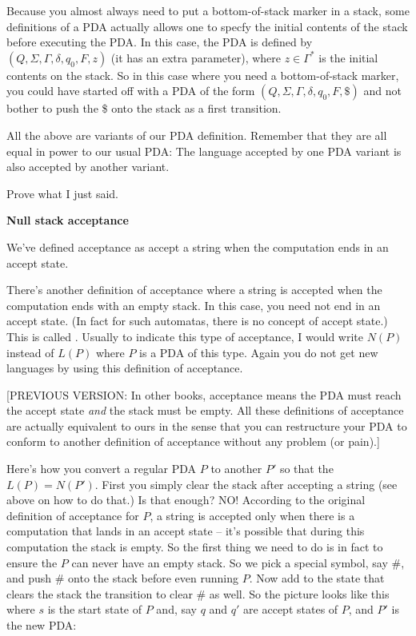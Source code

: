 Because you almost always need to put a bottom-of-stack marker in a stack,
some definitions of a PDA actually allows one to specfy the initial contents
of the stack before executing the PDA.
In this case, the PDA is defined by $(Q, \Sigma, \Gamma, \delta, q_0, F, z)$
(it has an extra parameter), where $z \in \Gamma^*$ is the initial contents
on the stack.
So in this case where you need a bottom-of-stack marker, you could have 
started off with a PDA of the form $(Q, \Sigma, \Gamma, \delta, q_0, F, \$)$
and not bother to push the \$ onto the stack as a first transition.

All the above are variants of our PDA definition.
Remember that they are all equal in power to our usual PDA:
The language accepted by one PDA variant is also accepted by another variant.

\begin{ex}
Prove what I just said.
\end{ex}


\textbf{Null stack acceptance}

We've defined acceptance as accept a string when the computation ends in an
accept state.

There's another definition of acceptance where a string is accepted when the 
computation ends with an empty stack. 
In this case, you need not end in an accept state.
(In fact for such automatas, there is no concept of accept state.)
This is called .
Usually to indicate this type of acceptance, I would write $N(P)$
instead of $L(P)$ where $P$ is a PDA of this type.
Again you do not get new languages by using this definition of acceptance.


[PREVIOUS
VERSION: 
In other books, acceptance means the PDA must reach the accept state
\textit{ and} the stack must be empty.
All these definitions of acceptance are actually equivalent to ours
in the sense that you can restructure your PDA to conform to another definition
of acceptance without any problem (or pain).]


Here's how you convert a regular PDA $P$ to another $P'$ so that the 
$L(P) = N(P')$.
First you simply clear the stack after accepting a string (see above on how to
do that.)
Is that enough?
NO! According to the original definition of acceptance for $P$,
a string is accepted only when there is a computation that lands in an accept 
state -- it's possible that during this computation the stack is empty.
So the first thing we need to do is in fact to ensure the $P$ can never
have an empty stack.
So we pick a special symbol, say \#, and push \# onto the stack before even
running $P$. Now add to the state that clears the stack the transition
to clear \# as well.
So the picture looks like this where $s$ is the start state of $P$ and,
say $q$ and $q'$ are accept states of $P$, and $P'$ is the new PDA:

